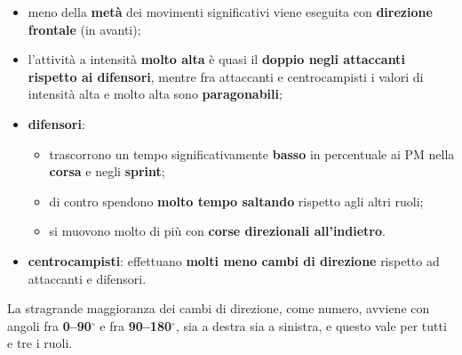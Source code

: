 \begin{itemize}
  \item meno della \textbf{metà} dei movimenti significativi viene eseguita con \textbf{direzione
    frontale} (in avanti);
  \item l'attività a intensità \textbf{molto alta} è quasi il \textbf{doppio negli attaccanti
    rispetto ai difensori}, mentre fra attaccanti e centrocampisti i valori di intensità alta e
    molto alta sono \textbf{paragonabili};
  \item \textbf{difensori}:
    \begin{itemize}
      \item trascorrono un tempo significativamente \textbf{basso} in percentuale ai PM nella
        \textbf{corsa} e negli \textbf{sprint};
      \item di contro spendono \textbf{molto tempo saltando} rispetto agli altri ruoli;
      \item si muovono molto di più con \textbf{corse direzionali all'indietro}.
    \end{itemize}
  \item \textbf{centrocampisti}: effettuano \textbf{molti meno cambi di direzione} rispetto ad
    attaccanti e difensori.
\end{itemize}

La stragrande maggioranza dei cambi di direzione, come numero, avviene con angoli fra
\textbf{0--90$^\circ$} e fra \textbf{90--180$^\circ$}, sia a destra sia a sinistra, e questo vale
per tutti e tre i ruoli.

